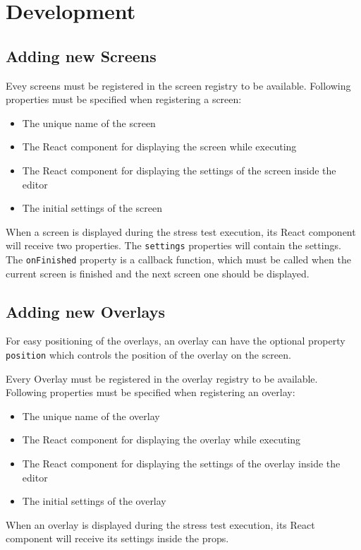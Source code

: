 \section{Development}
\label{sec:development}

\subsection{Adding new Screens}
\label{sec:development-screens}

Evey screens must be registered in the screen registry to be available.
Following properties must be specified when registering a screen:
\begin{itemize}
  \item The unique name of the screen
  \item The React component for displaying the screen while executing
  \item The React component for displaying the settings of the screen inside the editor
  \item The initial settings of the screen
\end{itemize}

When a screen is displayed during the stress test execution, its React component will receive two properties. 
The \texttt{settings} properties will contain the settings.
The \texttt{onFinished} property is a callback function, which must be called when the current screen is finished and the next screen one should be displayed.

\subsection{Adding new Overlays}
\label{sec:development-overlays}

For easy positioning of the overlays, an overlay can have the optional property \texttt{position} which controls the position of the overlay on the screen.

Every Overlay must be registered in the overlay registry to be available.
Following properties must be specified when registering an overlay:
\begin{itemize}
  \item The unique name of the overlay
  \item The React component for displaying the overlay while executing
  \item The React component for displaying the settings of the overlay inside the editor
  \item The initial settings of the overlay
\end{itemize}

When an overlay is displayed during the stress test execution, its React component will receive its settings inside the props.
